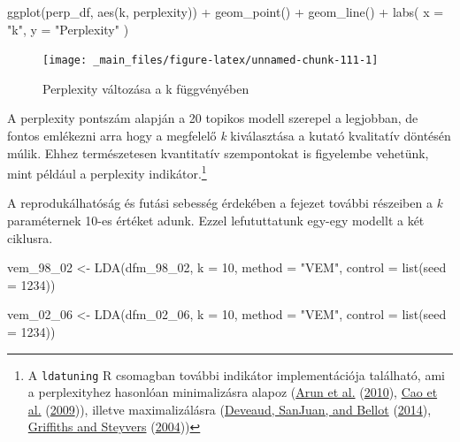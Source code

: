 \documentclass[
]{book}
\newenvironment{Shaded}{\begin{snugshade}}{\end{snugshade}}
\newcommand{\AttributeTok}[1]{\textcolor[rgb]{0.77,0.63,0.00}{#1}}
\newcommand{\DecValTok}[1]{\textcolor[rgb]{0.00,0.00,0.81}{#1}}
\newcommand{\FunctionTok}[1]{\textcolor[rgb]{0.00,0.00,0.00}{#1}}
\newcommand{\NormalTok}[1]{#1}
\newcommand{\OtherTok}[1]{\textcolor[rgb]{0.56,0.35,0.01}{#1}}
\newcommand{\SpecialCharTok}[1]{\textcolor[rgb]{0.00,0.00,0.00}{#1}}
\newcommand{\StringTok}[1]{\textcolor[rgb]{0.31,0.60,0.02}{#1}}
\begin{document}
\begin{Shaded}
\begin{Highlighting}[]
\FunctionTok{ggplot}\NormalTok{(perp\_df, }\FunctionTok{aes}\NormalTok{(k, perplexity)) }\SpecialCharTok{+}
  \FunctionTok{geom\_point}\NormalTok{() }\SpecialCharTok{+}
  \FunctionTok{geom\_line}\NormalTok{() }\SpecialCharTok{+}
  \FunctionTok{labs}\NormalTok{(}
    \AttributeTok{x =} \StringTok{"k"}\NormalTok{,}
    \AttributeTok{y =} \StringTok{"Perplexity"}
\NormalTok{  )}
\end{Highlighting}
\end{Shaded}

\begin{figure}

{\centering \texttt{[image: \_main\_files/figure-latex/unnamed-chunk-111-1]} 

}

\caption{Perplexity változása a k függvényében}\label{fig:unnamed-chunk-111}
\end{figure}

A perplexity pontszám alapján a 20 topikos modell szerepel a legjobban,
de fontos emlékezni arra hogy a megfelelő \emph{k} kiválasztása a kutató
kvalitatív döntésén múlik. Ehhez természetesen kvantitatív szempontokat
is figyelembe vehetünk, mint például a perplexity indikátor.\footnote{A
  \texttt{ldatuning} R csomagban további indikátor implementációja
  található, ami a perplexityhez hasonlóan minimalizásra alapoz
  (\protect\hyperlink{ref-arun2010finding}{Arun et al.}
  (\protect\hyperlink{ref-arun2010finding}{2010}),
  \protect\hyperlink{ref-cao2009density}{Cao et al.}
  (\protect\hyperlink{ref-cao2009density}{2009})), illetve
  maximalizálásra (\protect\hyperlink{ref-deveaud2014accurate}{Deveaud,
  SanJuan, and Bellot}
  (\protect\hyperlink{ref-deveaud2014accurate}{2014}),
  \protect\hyperlink{ref-griffiths2004}{Griffiths and Steyvers}
  (\protect\hyperlink{ref-griffiths2004}{2004}))}

A reprodukálhatóság és futási sebesség érdekében a fejezet további
részeiben a \emph{k} paraméternek 10-es értéket adunk. Ezzel
lefututtatunk egy-egy modellt a két ciklusra.

\begin{Shaded}
\begin{Highlighting}[]
\NormalTok{vem\_98\_02 }\OtherTok{\textless{}{-}} \FunctionTok{LDA}\NormalTok{(dfm\_98\_02, }\AttributeTok{k =} \DecValTok{10}\NormalTok{, }\AttributeTok{method =} \StringTok{"VEM"}\NormalTok{, }\AttributeTok{control =} \FunctionTok{list}\NormalTok{(}\AttributeTok{seed =} \DecValTok{1234}\NormalTok{))}

\NormalTok{vem\_02\_06 }\OtherTok{\textless{}{-}} \FunctionTok{LDA}\NormalTok{(dfm\_02\_06, }\AttributeTok{k =} \DecValTok{10}\NormalTok{, }\AttributeTok{method =} \StringTok{"VEM"}\NormalTok{, }\AttributeTok{control =} \FunctionTok{list}\NormalTok{(}\AttributeTok{seed =} \DecValTok{1234}\NormalTok{))}
\end{Highlighting}
\end{Shaded}
\end{document}
